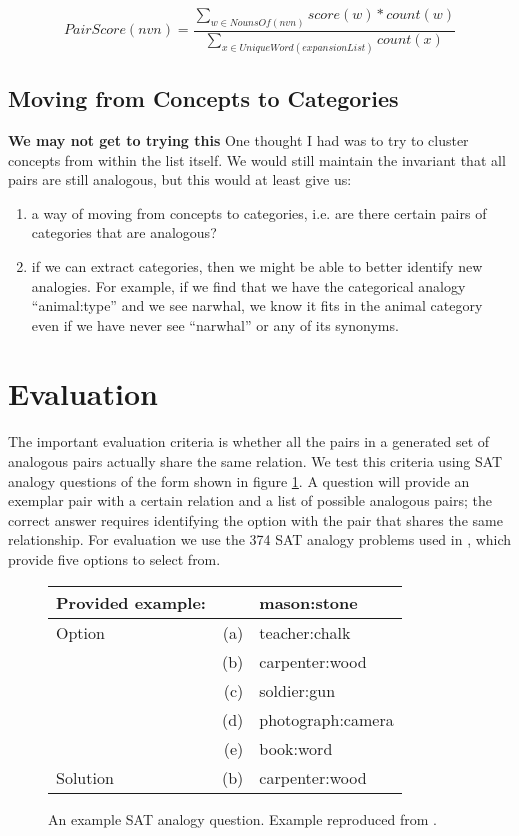 \documentclass[11pt]{article}
\begin{document}
\small
\[ PairScore(nvn) = \frac {\displaystyle\sum_{w \in NounsOf(nvn)} {score(w) * count(w)}}
                          {\displaystyle\sum_{x \in UniqueWord(expansionList)} count(x)} \]
\normalsize

\subsection{Moving from Concepts to Categories}

{\bf We may not get to trying this} One thought I had was to try to cluster
concepts from within the list itself.  We would still maintain the invariant
that all pairs are still analogous, but this would at least give us:
\begin{enumerate}
  \item a way of moving from concepts to categories, i.e. are there certain
    pairs of categories that are analogous?
  \item if we can extract categories, then we might be able to better identify
    new analogies.  For example, if we find that we have the categorical analogy
    ``animal:type'' and we see narwhal, we know it fits in the animal category
    even if we have never see ``narwhal'' or any of its synonyms.
\end{enumerate}

\section{Evaluation}
\label{sec:eval}

The important evaluation criteria is whether all the pairs in a generated set of
analogous pairs actually share the same relation.  We test this criteria using
SAT analogy questions of the form shown in figure \ref{fig:sat-question}.  A
question will provide an exemplar pair with a certain relation and a list of
possible analogous pairs; the correct answer requires identifying the option
with the pair that shares the same relationship.  For evaluation we use the 374
SAT analogy problems used in \cite{turney03combining}, which provide five
options to select from.  

\begin{figure}
  \begin{tabular}{lrl}
    \hline
    Provided example: & & mason:stone \\
    \hline
    Option & (a) & teacher:chalk \\
    & (b) & carpenter:wood  \\
    & (c) & soldier:gun \\
    & (d) & photograph:camera \\
    & (e) & book:word \\
    Solution & (b) & carpenter:wood  \\
    \hline
  \end{tabular}
  \caption{An example SAT analogy question.  Example reproduced from
    \cite{turney03combining}.}
  \label{fig:sat-question}
\end{figure}
\end{document}
